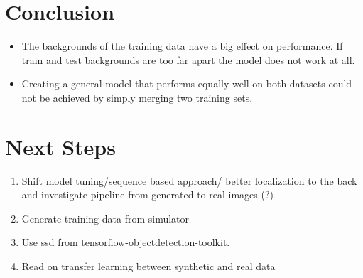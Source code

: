 \documentclass{article}
\begin{document}
\section{Conclusion}

\begin{itemize}
	\item The backgrounds of the training data have a big effect on performance. If train and test backgrounds are too far apart the model does not work at all.
	\item Creating a general model that performs equally well on both datasets could not be achieved by simply merging two training sets.
\end{itemize}

\section{Next Steps}
\begin{enumerate}
		\item Shift model tuning/sequence based approach/ better localization to the back and investigate pipeline from generated to real images (?)
		\item Generate training data from simulator
		\item Use ssd from tensorflow-objectdetection-toolkit.
		\item Read on transfer learning between synthetic and real data

\end{enumerate}









\end{document}

